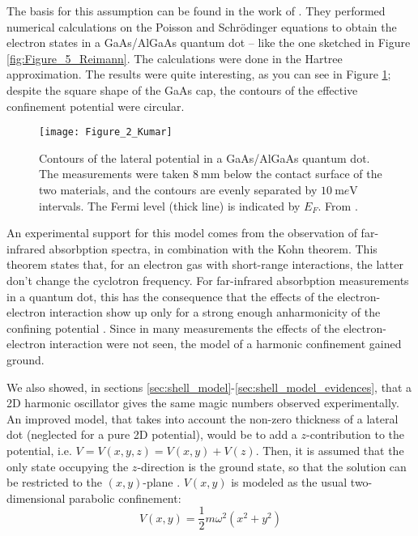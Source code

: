 The basis for this assumption can be found in the work of \cite{Kumar1990}. They performed numerical calculations on the Poisson and Schr\"{o}dinger equations to obtain the electron states in a GaAs/AlGaAs quantum dot -- like the one sketched in Figure \ref{fig:Figure_5_Reimann}. The calculations were done in the Hartree approximation. The results were quite interesting, as you can see in Figure \ref{fig:Figure_2_Kumar}; despite the square shape of the GaAs cap, the contours of the effective confinement potential were circular.

\begin{figure}[h]%
	\centering
	\texttt{[image: Figure\_2\_Kumar]}
	\caption{Contours of the lateral potential in a GaAs/AlGaAs quantum dot. The measurements were taken $\SI{8}{\milli\meter}$ below the contact surface of the two materials, and the contours are evenly separated by $\SI{10}{\milli e\volt}$ intervals. The Fermi level (thick line) is indicated by $E_F$. From \cite{Kumar1990}.}
	\label{fig:Figure_2_Kumar}
\end{figure}

An experimental support for this model comes from the observation of far-infrared absorbption spectra, in combination with the Kohn theorem. This theorem \citep[see][]{Kohn1961} states that, for an electron gas with short-range interactions, the latter don't change the cyclotron frequency. For far-infrared absorbption measurements in a quantum dot, this has the consequence that the effects of the electron-electron interaction show up only for a strong enough anharmonicity of the confining potential \citep[see][]{Reimann2002}. Since in many measurements the effects of the electron-electron interaction were not seen, the model of a harmonic confinement gained ground.

We also showed, in sections \ref{sec:shell_model}-\ref{sec:shell_model_evidences}, that a 2D harmonic oscillator gives the same magic numbers observed experimentally. An improved model, that takes into account the non-zero thickness of a lateral dot (neglected for a pure 2D potential), would be to add a $z$-contribution to the potential, i.e. $V=V(x,y,z) = V(x,y) + V(z)$. Then, it is assumed that the only state occupying the $z$-direction is the ground state, so that the solution can be restricted to the $(x,y)$-plane \citep[see][]{Reimann2002}. $V(x,y)$ is modeled as the usual two-dimensional parabolic confinement:
\begin{equation}
	V(x,y)=\frac{1}{2}m\omega^2(x^2+y^2)
\end{equation}

